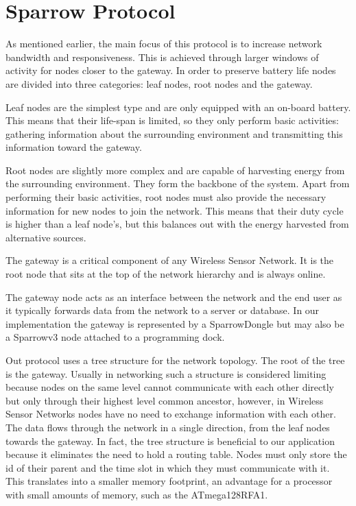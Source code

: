 
\chapter{Sparrow Protocol}

As mentioned earlier, the main focus of this protocol is to increase network
bandwidth and responsiveness. This is achieved through larger windows of
activity for nodes closer to the gateway. In order to preserve battery life
nodes are divided into three categories: leaf nodes, root nodes and the
gateway. 

Leaf nodes are the simplest type and are only equipped with an on-board
battery. This means that their life-span is limited, so they only perform basic
activities: gathering information about the surrounding environment and
transmitting this information toward the gateway. 

Root nodes are slightly more complex and are capable of harvesting energy from
the surrounding environment. They form the backbone of the system. Apart from
performing their basic activities, root nodes must also provide the necessary
information for new nodes to join the network. This means that their duty cycle
is higher than a leaf node's, but this balances out with the energy harvested
from alternative sources.

The gateway is a critical component of any Wireless Sensor Network. It is the
root node that sits at the top of the network hierarchy and is always online.

The gateway node acts as an interface between the network and the end user as
it typically forwards data from the network to a server or database. In our
implementation the gateway is represented by a SparrowDongle but may also be a
Sparrowv3 node attached to a programming dock.

Out protocol uses a tree structure for the network topology. The root of the
tree is the gateway. Usually in networking such a structure is considered
limiting because nodes on the same level cannot communicate with each other
directly but only through their highest level common ancestor, however, in
Wireless Sensor Networks nodes have no need to exchange information with each
other. The data flows through the network in a single direction, from the leaf
nodes towards the gateway. In fact, the tree structure is beneficial to our
application because it eliminates the need to hold a routing table. Nodes must
only store the id of their parent and the time slot in which they must
communicate with it. This translates into a smaller memory footprint, an
advantage for a processor with small amounts of memory, such as the
\mbox{ATmega128RFA1}.

